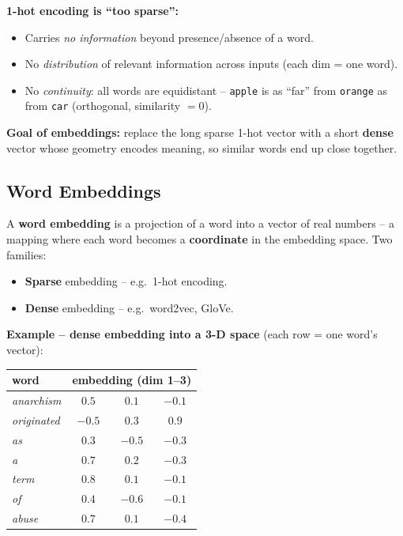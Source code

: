 \documentclass[10pt,a4paper]{article}
\begin{document}
	\begin{importantbox}
		\textbf{1-hot encoding is ``too sparse'':}
		\begin{itemize}[leftmargin=1.2em]
			\item Carries \emph{no information} beyond presence/absence of a word.
			\item No \emph{distribution} of relevant information across inputs (each dim = one word).
			\item No \emph{continuity}: all words are equidistant -- \texttt{apple} is as ``far'' from \texttt{orange} as from \texttt{car} (orthogonal, similarity $=0$).
		\end{itemize}
	\end{importantbox}

	\begin{definitionbox}
		\textbf{Goal of embeddings:} replace the long sparse 1-hot vector with a short \textbf{dense} vector whose geometry encodes meaning, so similar words end up close together.
	\end{definitionbox}

	\subsection{Word Embeddings}

	\begin{definitionbox}
		A \textbf{word embedding} is a projection of a word into a vector of real numbers -- a mapping where each word becomes a \textbf{coordinate} in the embedding space. Two families:
		\begin{itemize}[leftmargin=1.2em]
			\item \textbf{Sparse} embedding -- e.g.\ 1-hot encoding.
			\item \textbf{Dense} embedding -- e.g.\ word2vec, GloVe.
		\end{itemize}
	\end{definitionbox}

	\textbf{Example -- dense embedding into a 3-D space} (each row = one word's vector):
	\begin{center}
	\begin{tabular}{l ccc}
		\toprule
		word & \multicolumn{3}{c}{embedding (dim 1--3)} \\
		\midrule
		\textit{anarchism}  & $0.5$  & $0.1$  & $-0.1$ \\
		\textit{originated} & $-0.5$ & $0.3$  & $0.9$  \\
		\textit{as}         & $0.3$  & $-0.5$ & $-0.3$ \\
		\textit{a}          & $0.7$  & $0.2$  & $-0.3$ \\
		\textit{term}       & $0.8$  & $0.1$  & $-0.1$ \\
		\textit{of}         & $0.4$  & $-0.6$ & $-0.1$ \\
		\textit{abuse}      & $0.7$  & $0.1$  & $-0.4$ \\
		\bottomrule
	\end{tabular}
	\end{center}
\end{document}
